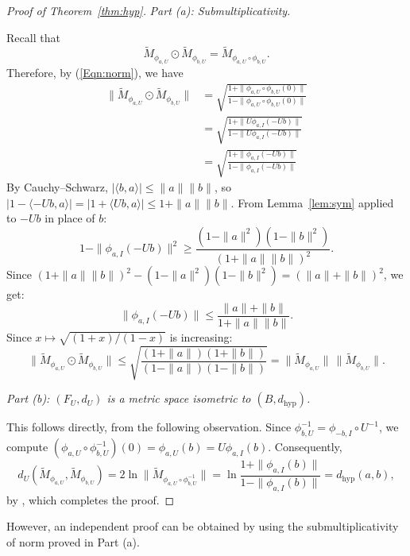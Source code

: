 \documentclass[12pt]{amsart}
\theoremstyle{definition}
\begin{document}
\begin{proof}[Proof of Theorem~\ref{thm:hyp}]
 
\noindent\textit{Part (a): Submultiplicativity.}
 
\medskip
 
\noindent Recall that
\[
\widetilde{M}_{\phi_{a,U}}\odot \widetilde{M}_{\phi_{b,U}} = \widetilde{M}_{\phi_{a,U}\circ \phi_{b,U}}.
\]
Therefore, by (\ref{Eqn:norm}), we have
\begin{align*}
\|\widetilde{M}_{\phi_{a,U}}\odot\widetilde{M}_{\phi_{b,U}}\| & = \sqrt{\frac{1+\|\phi_{a,U}\circ \phi_{b,U}(0)\|}{1-\|\phi_{a,U}\circ \phi_{b,U}(0)\|}}\\
& = \sqrt{\frac{1+\|U\phi_{a,I}(-Ub)\|}{1-\|U\phi_{a,I}(-Ub)\|}}\\
& = \sqrt{\frac{1+\|\phi_{a,I}(-Ub)\|}{1-\|\phi_{a,I}(-Ub)\|}}
\end{align*}
By Cauchy--Schwarz, $|\langle b,a\rangle|\leq\|a\|\|b\|$, so $|1-\langle -Ub,a\rangle| = |1+\langle Ub,a\rangle|\leq 1+\|a\|\|b\|$. From Lemma~\ref{lem:sym} applied to $-Ub$ in place of $b$:
\[
1-\|\phi_{a,I}(-Ub)\|^2 \geq \frac{(1-\|a\|^2)(1-\|b\|^2)}{(1+\|a\|\|b\|)^2}.
\]
Since $(1+\|a\|\|b\|)^2-(1-\|a\|^2)(1-\|b\|^2) = (\|a\|+\|b\|)^2$, we get:
\[
\|\phi_{a,I}(-Ub)\| \leq \frac{\|a\|+\|b\|}{1+\|a\|\|b\|}.
\]
Since $x\mapsto\sqrt{(1+x)/(1-x)}$ is increasing:
\[
\|\widetilde{M}_{\phi_{a,U}}\odot\widetilde{M}_{\phi_{b,U}}\|
\leq \sqrt{\frac{(1+\|a\|)(1+\|b\|)}{(1-\|a\|)(1-\|b\|)}}
= \|\widetilde{M}_{\phi_{a,U}}\|\,\|\widetilde{M}_{\phi_{b,U}}\|. 
\]
 
\medskip


 
\noindent\textit{Part (b): $(F_U,d_U)$ is a metric space isometric to $(B,d_{\mathrm{hyp}})$.}
 
\medskip
 
\noindent This follows directly, from the following observation. Since $\phi_{b,U}^{-1} = \phi_{-b,I}\circ U^{-1}$, we compute $(\phi_{a,U}\circ\phi_{b,U}^{-1})(0) = \phi_{a,U}(b) = U\phi_{a,I}(b)$. Consequently,
\[
d_U(\widetilde{M}_{\phi_{a,U}},\widetilde{M}_{\phi_{b,U}})
= 2\ln\|\widetilde{M}_{\phi_{a,U}\circ\phi_{b,U}^{-1}}\|
= \ln\frac{1+\|\phi_{a,I}(b)\|}{1-\|\phi_{a,I}(b)\|} =  d_{\mathrm{hyp}}(a,b),
\]
by \cite{Goebel-Reich, FV}, which completes the proof.
\end{proof}
\noindent However, an independent proof can be obtained by using the submultiplicativity of norm proved in Part (a).
\end{document}
